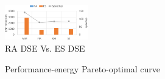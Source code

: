\documentclass{acm_proc_article-sp}
\begin{document}
\begin{figure}[tbh]
    \centering
    \includegraphics[width=0.32\textwidth]{DSE-Time}
    \caption{RA DSE Vs. ES DSE}
    \label{fig:DSE-Time}
\end{figure}

\begin{figure}[tbh]
    \centering
    \hfill
    \caption{Performance-energy Pareto-optimal curve}
	\label{fig:DSE2}
\end{figure}
\end{document}
